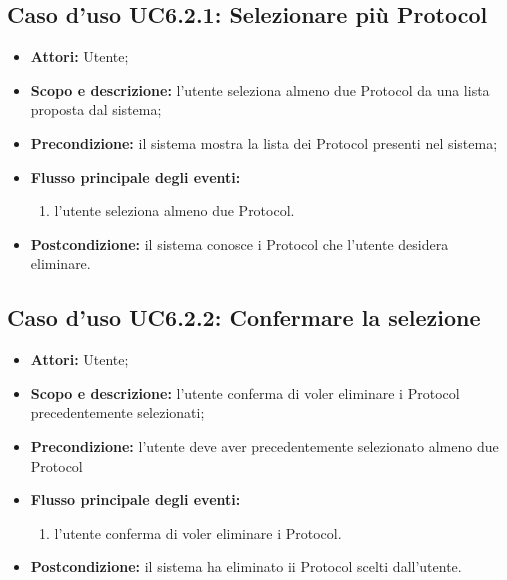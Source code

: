 \subsection{Caso d'uso UC6.2.1: Selezionare più Protocol}
\begin{itemize}
\item \textbf{Attori:} Utente;
\item \textbf{Scopo e descrizione:} l'utente seleziona almeno due Protocol\glossario{} da una lista proposta dal sistema;
\item \textbf{Precondizione:} il sistema mostra la lista dei Protocol\glossario{} presenti nel sistema;
\item \textbf{Flusso principale degli eventi:}
\begin{enumerate}
\item l'utente seleziona almeno due Protocol\glossario{}.
\end{enumerate}
\item \textbf{Postcondizione: } il sistema conosce i Protocol\glossario{} che l'utente desidera eliminare.
\end{itemize}


\subsection{Caso d'uso UC6.2.2: Confermare la selezione}
\begin{itemize}
\item \textbf{Attori:} Utente;
\item \textbf{Scopo e descrizione:} l'utente conferma di voler eliminare i Protocol\glossario{} precedentemente selezionati;
\item \textbf{Precondizione:} l'utente deve aver precedentemente selezionato almeno due Protocol
\item \textbf{Flusso principale degli eventi:}
\begin{enumerate}
\item l'utente conferma di voler eliminare i Protocol\glossario{}.
\end{enumerate}
\item \textbf{Postcondizione:} il sistema ha eliminato ii Protocol\glossario{} scelti dall'utente.
\end{itemize}

\pagebreak

